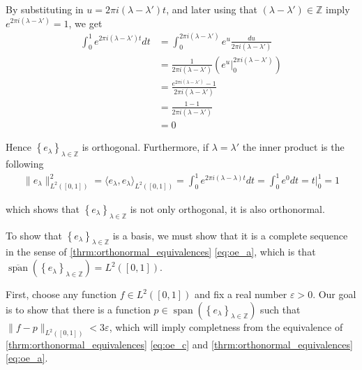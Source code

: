 \documentclass[../thesis.tex]{subfiles}
\begin{document}
By substituting in $u= 2 \pi i (\lambda-\lambda')t$, and later using that $(\lambda-\lambda') \in \mathbb{Z}$ imply $e^{2 \pi i (\lambda-\lambda')} = 1$,  we get
\begin{align*} 
\int_0^1 e^{2 \pi i (\lambda-\lambda')t} dt 
&= \int_0^{2 \pi i(\lambda-\lambda')} e^{u} \frac{du}{2 \pi i (\lambda-\lambda')}\\ 
&=\frac{1}{2 \pi i (\lambda-\lambda')}\left( e^u  \big| _0^{2 \pi i (\lambda-\lambda')}\right)\\
&=\frac{e^{2 \pi i(\lambda-\lambda')}-1}{2 \pi i (\lambda-\lambda')}\\ &=\frac{1-1}{2 \pi i (\lambda-\lambda')} \\
&= 0
\end{align*}

Hence $\left\{ e_{\lambda} \right\}_{\lambda\in \mathbb{Z}}$ is orthogonal. Furthermore, if  $\lambda =\lambda'$ the inner product is the following
\begin{align}\label{eq:exp_norm_one}
    \| e_\lambda \|^2_{L^2([0,1])} 
    = \langle e_{\lambda},e_{\lambda} \rangle_{L^2([0,1])} 
    = \int_0^1 e^{2 \pi i (\lambda-\lambda)t} dt
    = \int_0^1 e^{0} dt = t  \big| _0^{1}= 1
\end{align}

which shows that $\left\{ e_{\lambda} \right\}_{\lambda\in \mathbb{Z}}$ is not only orthogonal, it is also orthonormal. 


To show that $\left\{ e_{\lambda} \right\}_{\lambda\in \mathbb{Z}}$ is a basis, we must show that it is a complete sequence in the sense of \cref{thrm:orthonormal_equivalences} \cref{eq:oe_a}, which is that $\overline{\operatorname{span}} \left( \left\{ e_{\lambda} \right\}_{\lambda\in \mathbb{Z}} \right) = L^2{([0,1])}$.

First, choose any function $f\in L^2([0,1])$ and fix a real number $\varepsilon >0$. Our goal is to show that there is a function $p \in \operatorname{span} \left( \left\{ e_{\lambda} \right\}_{\lambda\in \mathbb{Z}} \right)$ such that $\|f-p\|_{L^2([0,1])} < 3 \varepsilon$, which will imply completness from the equivalence of \cref{thrm:orthonormal_equivalences} \cref{eq:oe_c} and \cref{thrm:orthonormal_equivalences} \cref{eq:oe_a}.
\end{document}
